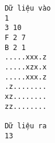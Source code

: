 \begin{verbatim}
Dữ liệu vào
1
3 10
F 2 7
B 2 1
.....xxx.z
.....xzx.x
.....xxx.z
.z........
xz........
zz........	

Dữ liệu ra
13
\end{verbatim}